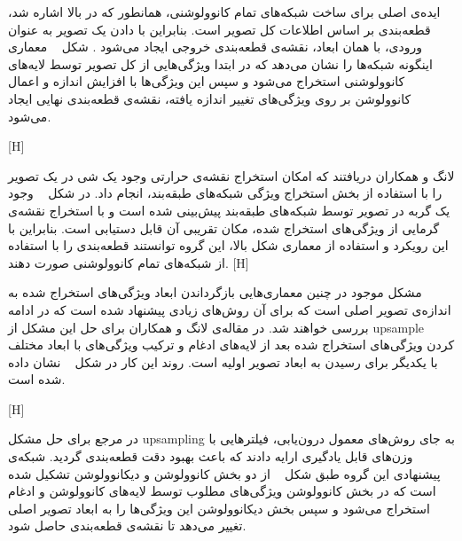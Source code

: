 ایده‌ی اصلی برای ساخت شبکه‌های تمام کانوولوشنی، همانطور که در بالا اشاره شد، قطعه‌بندی بر اساس اطلاعات کل تصویر است. بنابراین با دادن یک تصویر به عنوان ورودی، با همان ابعاد، نقشه‌ی قطعه‌بندی خروجی ایجاد می‌شود . شکل ~ معماری اینگونه شبکه‌ها را نشان می‌دهد که در ابتدا ویژگی‌هایی از کل تصویر توسط لایه‌های کانوولوشنی استخراج می‌شود و سپس این ویژگی‌ها با افزایش اندازه و اعمال کانوولوشن بر روی ویژگی‌های تغییر اندازه یافته، نقشه‌ی قطعه‌بندی نهایی ایجاد می‌شود.

[H]

لانگ و همکاران  دریافتند که امکان استخراج نقشه‌ی حرارتی وجود یک شی در یک تصویر را با استفاده از بخش استخراج ویژگی شبکه‌های طبقه‌بند، انجام داد. در شکل ~ وجود یک گربه در تصویر توسط شبکه‌های طبقه‌بند پیش‌بینی شده است و با استخراج نقشه‌ی گرمایی از ویژگی‌های استخراج شده، مکان تقریبی آن قابل دستیابی است. بنابراین با این رویکرد و استفاده از معماری شکل بالا، این گروه توانستند قطعه‌بندی را با استفاده از شبکه‌های تمام کانوولوشنی صورت دهند. 
[H]

مشکل موجود در چنین معماری‌هایی بازگرداندن ابعاد ویژگی‌های استخراج شده به اندازه‌ی تصویر اصلی است که برای آن روش‌های زیادی پیشنهاد شده است که در ادامه بررسی خواهند شد. در مقاله‌ی لانگ و همکاران برای حل این مشکل از upsample کردن ویژگی‌های استخراج شده بعد از لایه‌های ادغام و ترکیب ویژگی‌های با ابعاد مختلف با یکدیگر برای رسیدن به ابعاد تصویر اولیه است. روند این کار در شکل ~ نشان داده شده است.

[H]

در مرجع  برای حل مشکل upsampling به جای روش‌های معمول درون‌یابی، فیلترهایی با وزن‌های قابل یادگیری ارایه دادند که باعث بهبود دقت قطعه‌بندی گردید. شبکه‌ی پیشنهادی این گروه طبق شکل ~ از دو بخش کانوولوشن و دیکانوولوشن تشکیل شده است که در بخش کانوولوشن ویژگی‌های مطلوب توسط لایه‌های کانوولوشن و ادغام استخراج می‌شود و سپس بخش دیکانوولوشن این ویژگی‌ها را به ابعاد تصویر اصلی تغییر می‌دهد تا نقشه‌ی قطعه‌بندی حاصل شود. 

